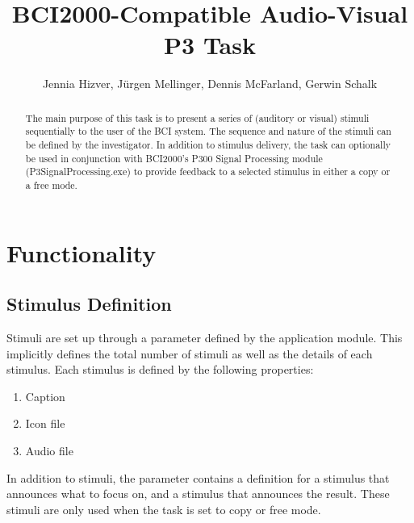 \documentclass[letterpaper,oneside,12pt]{article}
\begin{document}
%
\title{BCI2000-Compatible Audio-Visual P3 Task}
\author{Jennia Hizver, J\"{u}rgen Mellinger, Dennis McFarland, Gerwin Schalk}
\maketitle

\tableofcontents

\newpage 

\begin{abstract}

The main purpose of this task is to present a series of (auditory or visual) 
stimuli sequentially to the user of the BCI system. The sequence and nature of 
the stimuli can be defined by the investigator. In addition to stimulus 
delivery, the task can optionally be used in conjunction with BCI2000's P300 
Signal Processing module (P3SignalProcessing.exe) to provide feedback to a 
selected stimulus in either a copy or a free mode.

\end{abstract}

\section{Functionality}

\subsection{Stimulus Definition}
\label{sec:stimulusdefinition}

Stimuli are set up through a parameter defined by the application module. This
implicitly defines the total number of stimuli as well as the details of each stimulus.
Each stimulus is defined by the following properties:
\begin{enumerate}
 \item Caption
 \item Icon file
 \item Audio file
\end{enumerate}

In addition to stimuli, the parameter contains a definition for a stimulus that 
announces what to focus on, and a stimulus that announces the result. These
stimuli are only used when the task is set to copy or free mode.
\end{document}
